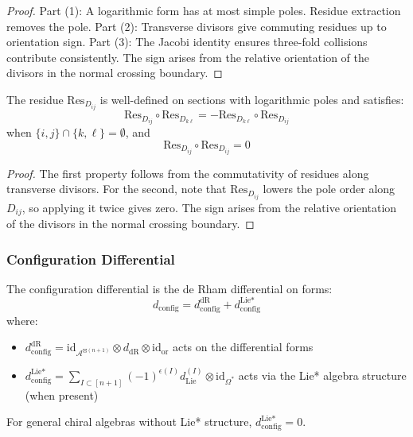    \begin{proof}
   Part (1): A logarithmic form has at most simple poles. Residue extraction removes the pole.
   Part (2): Transverse divisors give commuting residues up to orientation sign.
   Part (3): The Jacobi identity ensures three-fold collisions contribute consistently.
   The sign arises from the relative orientation of the divisors in the normal crossing boundary.
   \end{proof}
 
\begin{lemma}
The residue $\text{Res}_{D_{ij}}$ is well-defined on sections with logarithmic poles and satisfies:
\[
\text{Res}_{D_{ij}} \circ \text{Res}_{D_{k\ell}} = -\text{Res}_{D_{k\ell}} \circ \text{Res}_{D_{ij}}
\]
when $\{i,j\} \cap \{k,\ell\} = \emptyset$, and
\[
\text{Res}_{D_{ij}} \circ \text{Res}_{D_{ij}} = 0
\]
\end{lemma}
 
\begin{proof}
The first property follows from the commutativity of residues along transverse divisors. For the second,
note that $\text{Res}_{D_{ij}}$ lowers the pole order along $D_{ij}$, so applying it twice gives zero.
The sign arises from the relative orientation of the divisors in the normal crossing boundary.
\end{proof}
 
\subsubsection{Configuration Differential}
 
\begin{definition}
   The configuration differential is the de Rham differential on forms:
   $$d_{\text{config}} = d_{\text{config}}^{\text{dR}} + d_{\text{config}}^{\text{Lie*}}$$
   where:
   \begin{itemize}
   \item $d_{\text{config}}^{\text{dR}} = \text{id}_{\mathcal{A}^{\boxtimes(n+1)}} \otimes d_{\text{dR}} \otimes \text{id}_{\text{or}}$ 
     acts on the differential forms
   \item $d_{\text{config}}^{\text{Lie*}} = \sum_{I \subset [n+1]} (-1)^{\epsilon(I)} d_{\text{Lie}}^{(I)} \otimes \text{id}_{\Omega^*}$ 
     acts via the Lie* algebra structure (when present)
   \end{itemize}
   
   For general chiral algebras without Lie* structure, $d_{\text{config}}^{\text{Lie*}} = 0$.
   \end{definition}
   
